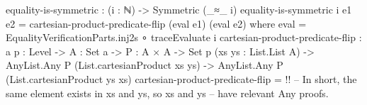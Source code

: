 \documentclass{report}
\begin{document}
\begin{code}
  equality-is-symmetric : (i : ℕ) -> Symmetric (_≈_ i)
  equality-is-symmetric i {e1} {e2} = cartesian-product-predicate-flip (eval e1) (eval e2)
    where
    eval = EqualityVerificationParts.inj2s ∘ traceEvaluate i
    cartesian-product-predicate-flip :
      {a p : Level} ->
      {A : Set a} ->
      {P : A × A -> Set p}
      (xs ys : List.List A) ->
      AnyList.Any P (List.cartesianProduct xs ys) ->
      AnyList.Any P (List.cartesianProduct ys xs)
    cartesian-product-predicate-flip = {!!}
    -- In short, the same element exists in xs and ys, so xs and ys
    -- have relevant Any proofs.
\end{code}
\end{document}
